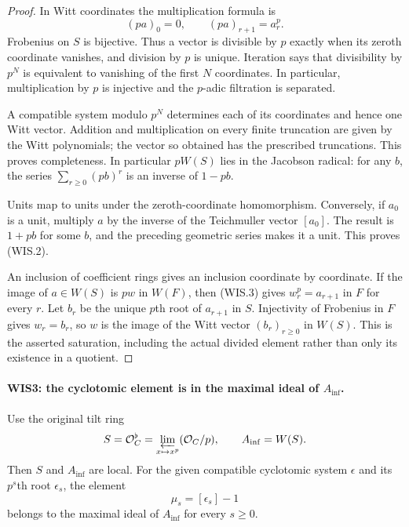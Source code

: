 \documentclass[11pt,a4paper]{article}
\numberwithin{equation}{section}
\theoremstyle{remark}\newtheorem{remark}[theorem]{Remark}
\begin{document}
\begin{proof}
In Witt coordinates the multiplication formula is
\[
          (pa)_0=0,\qquad (pa)_{r+1}=a_r^p.                 \tag{WIS.3}
\]
Frobenius on $S$ is bijective. Thus a vector is divisible by $p$
exactly when its zeroth coordinate vanishes, and division by $p$
is unique. Iteration says that divisibility by $p^N$ is equivalent
to vanishing of the first $N$ coordinates. In particular,
multiplication by $p$ is injective and the $p$-adic filtration is
separated.

A compatible system modulo $p^N$ determines each of its coordinates
and hence one Witt vector. Addition and multiplication on every
finite truncation are given by the Witt polynomials; the vector
so obtained has the prescribed truncations. This proves
completeness. In particular $pW(S)$ lies in the Jacobson radical:
for any $b$, the series $\sum_{r\geq0}(pb)^r$ is an inverse of
$1-pb$.

Units map to units under the zeroth-coordinate homomorphism.
Conversely, if $a_0$ is a unit, multiply $a$ by the inverse of
the Teichmuller vector $[a_0]$. The result is $1+pb$ for some
$b$, and the preceding geometric series makes it a unit.
This proves (WIS.2).

An inclusion of coefficient rings gives an inclusion coordinate
by coordinate. If the image of $a\in W(S)$ is $pw$ in $W(F)$,
then (WIS.3) gives $w_r^p=a_{r+1}$ in $F$ for every $r$.
Let $b_r$ be the unique $p$th root of $a_{r+1}$ in $S$.
Injectivity of Frobenius in $F$ gives $w_r=b_r$, so
$w$ is the image of the Witt vector $(b_r)_{r\geq0}$ in $W(S)$.
This is the asserted saturation, including the actual divided
element rather than only its existence in a quotient.
\end{proof}

\paragraph{WIS3: the cyclotomic element is in the maximal ideal of $A_{\inf}$.}
\label{claim:WIS3}
Use the original tilt ring
\[
 S=\mathcal O_C^\flat
   =\varprojlim_{x\mapsto x^p}(\mathcal O_C/p),\qquad
 A_{\inf}=W(S).
\]
Then $S$ and $A_{\inf}$ are local. For the given compatible
cyclotomic system $\epsilon$ and its $p^s$th root $\epsilon_s$,
the element
\[
                         \mu_s=[\epsilon_s]-1             \tag{WIS.4}
\]
belongs to the maximal ideal of $A_{\inf}$ for every $s\geq0$.
\end{document}
